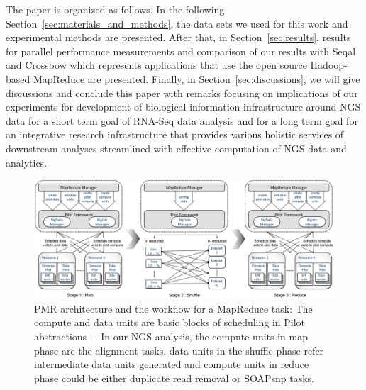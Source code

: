 \documentclass{acm_proc_article-sp}
\begin{document}
The paper is organized as follows. In the following
Section~\ref{sec:materials_and_methods}, the data sets we used for
this work and experimental methods are presented.  
After that, in Section~\ref{sec:results}, results for parallel performance
measurements and comparison of our results with Seqal and Crossbow
which represents applications that use the open source Hadoop-based
MapReduce\cite{hadoop-url, taylor2010,seal_2011_mapred,seal2011} are
presented.  Finally, in Section~\ref{sec:discussions}, we will give
discussions and conclude this paper with remarks focusing on
implications of our experiments for development of biological
information infrastructure around NGS data for a short term goal of
RNA-Seq data analysis and for a long term goal for an integrative
research infrastructure that provides various holistic services of
downstream analyses streamlined with effective computation of NGS data
and analytics.

\begin{center}
\hfill{}
\begin{figure}
 \centering
\includegraphics[scale=0.35]{figures/F1_1.pdf} 
\hfill{}
\caption{\small PMR architecture and the workflow for a MapReduce task: The compute and data units are basic blocks of scheduling in Pilot abstractions ~\cite{pstar11}. In our NGS analysis, the compute units in map phase are the alignment tasks, data units in the shuffle phase refer intermediate data units generated and compute units in reduce phase could be either duplicate read removal or SOAPsnp tasks.}
  \label{fig:arch-pj-saga-mr} 
\end{figure}
\end{center}

\end{document}

